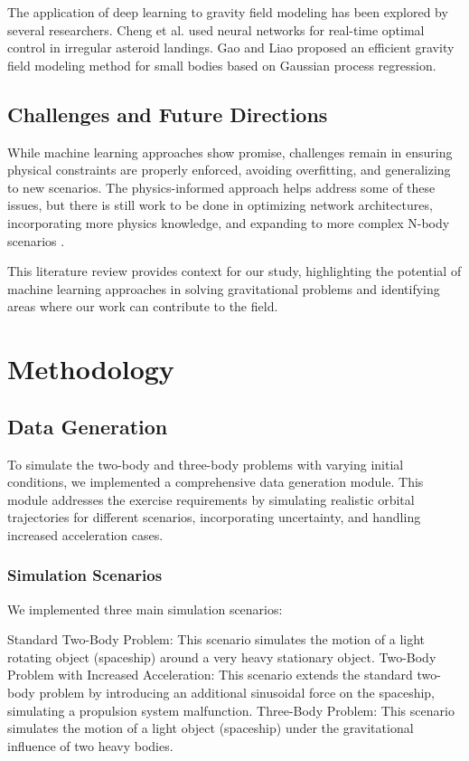 \documentclass[12pt,a4paper]{article}
\begin{document}
The application of deep learning to gravity field modeling has been explored by several researchers. Cheng et al. \cite{cheng2020} used neural networks for real-time optimal control in irregular asteroid landings. Gao and Liao \cite{gao2019} proposed an efficient gravity field modeling method for small bodies based on Gaussian process regression.

\subsection{Challenges and Future Directions}

While machine learning approaches show promise, challenges remain in ensuring physical constraints are properly enforced, avoiding overfitting, and generalizing to new scenarios. The physics-informed approach helps address some of these issues, but there is still work to be done in optimizing network architectures, incorporating more physics knowledge, and expanding to more complex N-body scenarios \cite{martin2022physics}.

This literature review provides context for our study, highlighting the potential of machine learning approaches in solving gravitational problems and identifying areas where our work can contribute to the field.

\section{Methodology}
\label{sec:methodology}

\subsection{Data Generation}
To simulate the two-body and three-body problems with varying initial conditions, we implemented a comprehensive data generation module. This module addresses the exercise requirements by simulating realistic orbital trajectories for different scenarios, incorporating uncertainty, and handling increased acceleration cases.
\subsubsection{Simulation Scenarios}
We implemented three main simulation scenarios:

Standard Two-Body Problem: This scenario simulates the motion of a light rotating object (spaceship) around a very heavy stationary object.
Two-Body Problem with Increased Acceleration: This scenario extends the standard two-body problem by introducing an additional sinusoidal force on the spaceship, simulating a propulsion system malfunction.
Three-Body Problem: This scenario simulates the motion of a light object (spaceship) under the gravitational influence of two heavy bodies.
\end{document}
